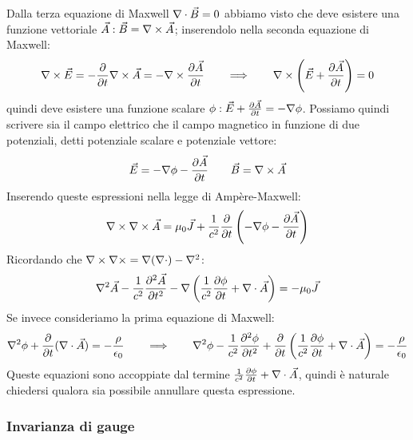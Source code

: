 Dalla terza equazione di Maxwell $ \nabla\cdot\vec{B} = 0 $ abbiamo visto che deve esistere una funzione vettoriale $ \vec{A} : \vec{B} = \nabla\times\vec{A} $; inserendolo nella seconda equazione di Maxwell:
\begin{equation}
	\nabla\times\vec{E} = -\frac{\partial}{\partial t} \nabla\times\vec{A} = - \nabla\times \frac{\partial\vec{A}}{\partial t} \qquad\Longrightarrow\qquad \nabla\times\left(\vec{E} + \frac{\partial\vec{A}}{\partial t}\right) = 0
	\label{eq:71}
\end{equation}
quindi deve esistere una funzione scalare $ \phi : \vec{E} + \frac{\partial\vec{A}}{\partial t} = -\nabla\phi $. Possiamo quindi scrivere sia il campo elettrico che il campo magnetico in funzione di due potenziali, detti potenziale scalare e potenziale vettore:
\begin{equation}
	\vec{E} = - \nabla\phi - \frac{\partial\vec{A}}{\partial t} \qquad \vec{B} = \nabla\times\vec{A}
	\label{eq:72}
\end{equation}
Inserendo queste espressioni nella legge di Ampère-Maxwell:
\begin{equation}
	\nabla\times\nabla\times\vec{A} = \mu_0 \vec{J} + \frac{1}{c^2} \frac{\partial}{\partial t} \left(-\nabla\phi - \frac{\partial\vec{A}}{\partial t}\right)
	\label{eq:73}
\end{equation}
Ricordando che $ \nabla\times\nabla\times = \nabla(\nabla\cdot) - \nabla^2 $:
\begin{equation}
	\nabla^2\vec{A} - \frac{1}{c^2} \frac{\partial^2\vec{A}}{\partial t^2} - \nabla\left( \frac{1}{c^2} \frac{\partial\phi}{\partial t} + \nabla\cdot\vec{A} \right) = -\mu_0 \vec{J}
	\label{eq:74}
\end{equation}
Se invece consideriamo la prima equazione di Maxwell:
\begin{equation}
	\nabla^2\phi + \frac{\partial}{\partial t} (\nabla\cdot\vec{A}) = -\frac{\rho}{\epsilon_0} \qquad\Longrightarrow\qquad \nabla^2 \phi - \frac{1}{c^2} \frac{\partial^2 \phi}{\partial t^2} + \frac{\partial}{\partial t} \left( \frac{1}{c^2} \frac{\partial\phi}{\partial t} + \nabla\cdot\vec{A} \right) = -\frac{\rho}{\epsilon_0}
	\label{eq:75}
\end{equation}
Queste equazioni sono accoppiate dal termine $ \frac{1}{c^2} \frac{\partial\phi}{\partial t} + \nabla\cdot\vec{A} $, quindi è naturale chiedersi qualora sia possibile annullare questa espressione. 

\subsubsection{Invarianza di gauge}

